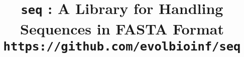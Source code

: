 

\pagestyle{noweb}

\title{\texttt{seq} : A Library for Handling Sequences in
FASTA Format\\\small\texttt{https://github.com/evolbioinf/seq}}
\author{}

\date{}
\maketitle




